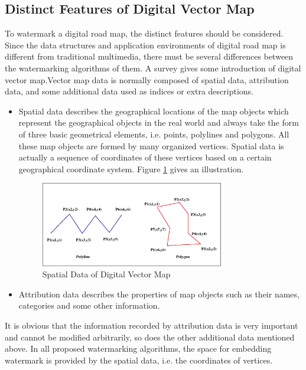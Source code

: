 \subsection{Distinct Features of Digital Vector Map}
To watermark a digital road map, the distinct features should be considered. 
Since the data structures and application environments of digital road map is
different from traditional multimedia, there must be several differences between 
the watermarking algorithms of them. A survey\cite{Survey} gives some introduction of digital
vector map.Vector map data is normally composed of spatial data, attribution data,
 and some additional data used as indices or extra descriptions.
\begin{itemize}

\item Spatial data describes the geographical locations of the map
objects which represent the geographical objects in the real world and always take the
form of three basic geometrical elements, i.e. points, polylines and polygons. All these
map objects are formed by many organized vertices. Spatial data is actually a sequence
of coordinates of these vertices based on a certain geographical coordinate system.
Figure \ref{fig:1} gives an illustration.

\begin{figure}[htbp]
\centering
\includegraphics[width=8cm]{polyline.eps}
\caption{Spatial Data of Digital Vector Map}
\label{fig:1}
\end{figure}

\item Attribution data describes the properties of map objects such as their names, categories
and some other information.
\end{itemize}


It is obvious that the information recorded by attribution data is very important 
and cannot be modified arbitrarily, so does the other additional
data mentioned above. In all proposed watermarking algorithms, the space for embedding 
watermark is provided by the spatial data, i.e. the coordinates of vertices. 

